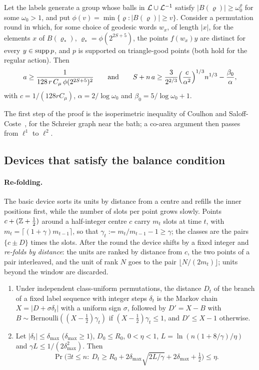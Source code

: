 \begin{proposition}\label{prop:growth}
Let the labels generate a group whose balls in $\mathcal L\cup\mathcal L^{-1}$ satisfy $|B(\varrho)|\ge\omega_0^\varrho$ for some $\omega_0>1$, and put
$\phi(v)=\min\{\varrho:|B(\varrho)|\ge v\}$. Consider a permutation round in which, for some choice of geodesic words $w_x$, of length $|x|$, for the elements $x$ of
$B(\varrho_*)$, $\varrho_*=\phi(2^{2S+5})$, the points $f(w_x)y$ are distinct for every $y\in\operatorname{supp} p$, and $p$ is supported on triangle-good points (both hold for the regular action). Then
\[
a\ge\frac1{128\,r\,C_\mu\,\phi(2^{2S+5})^2}\qquad\text{and}\qquad S+n\,a\ge\frac3{2^{2/3}}\Bigl(\frac c{\alpha^2}\Bigr)^{1/3}n^{1/3}-\frac{\beta_0}\alpha,
\]
with $c=1/(128rC_\mu)$, $\alpha=2/\log\omega_0$ and $\beta_0=5/\log\omega_0+1$.
\end{proposition}

The first step of the proof is the isoperimetric inequality of Coulhon and Saloff-Coste~\cite[Th\'eor\`eme~1]{CoulhonSaloffCoste1993}, for the
Schreier graph near the bath; a co-area argument then passes from $\ell^1$ to $\ell^2$.

\subsection{Devices that satisfy the balance condition}

\paragraph{Re-folding.} The basic device sorts its units by distance from a centre and refills the inner positions first, while the number of
slots per point grows slowly. Points $c+(\mathbb Z+\frac12)$ around a half-integer centre $c$ carry $m_t$ slots at time $t$, with
$m_t=\lceil(1+\gamma)m_{t-1}\rceil$, so that $\gamma_t:=m_t/m_{t-1}-1\ge\gamma$; the classes are the pairs $\{c\pm D\}$ times the slots. After the round
the device shifts by a fixed integer and \emph{re-folds by distance}: the units are ranked by distance from $c$, the two points of a pair
interleaved, and the unit of rank $N$ goes to the pair $\lfloor N/(2m_t)\rfloor$; units beyond the window are discarded.

\begin{lemma}\label{lem:refold}
\begin{enumerate}[label=(\alph*),itemsep=1pt]
\item Under independent class-uniform permutations, the distance $D_t$ of the branch of a fixed label sequence with integer steps $\delta_t$ is the
Markov chain $X=|D+\sigma\delta_t|$ with a uniform sign $\sigma$, followed by $D'=X-B$ with $B\sim\mathrm{Bernoulli}((X-\frac12)\gamma_t)$ if
$(X-\frac12)\gamma_t\le1$, and $D'\le X-1$ otherwise.
\item Let $|\delta_t|\le\delta_{\max}$ ($\delta_{\max}\ge1$), $D_0\le R_0$, $0<\eta<1$, $L=\ln(n(1+8/\gamma)/\eta)$ and $\gamma L\le1/(2\delta_{\max}^2)$. Then
\[
\Pr\bigl(\exists t\le n:\ D_t\ge R_0+2\delta_{\max}\sqrt{2L/\gamma}+2\delta_{\max}+\tfrac12\bigr)\le\eta .
\]
\end{enumerate}
\end{lemma}

